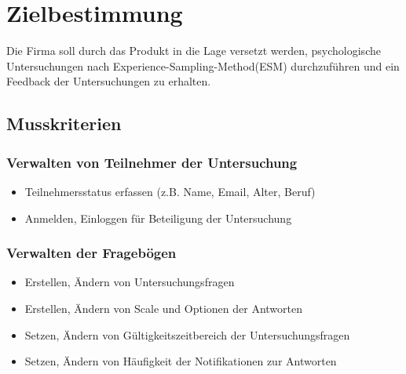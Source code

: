 \documentclass[a4paper]{scrreprt}
\begin{document}
 
 
    \tableofcontents
 
    \chapter{Zielbestimmung}
        Die Firma soll durch das Produkt in die Lage versetzt werden, psychologische Untersuchungen nach Experience-Sampling-Method(ESM) durchzuf\"uhren und ein Feedback der Untersuchungen zu erhalten.
 
 
        \section{Musskriterien}

            \subsection{Verwalten von Teilnehmer der Untersuchung}
                \begin{itemize}
                    \item Teilnehmersstatus erfassen (z.B. Name, Email, Alter, Beruf)
                    \item Anmelden, Einloggen f\"ur Beteiligung der Untersuchung
                \end{itemize}
            
            \subsection{Verwalten der Frageb\"ogen}
                \begin{itemize}
                    \item Erstellen, \"Andern von Untersuchungsfragen
                    \item Erstellen, \"Andern von Scale und Optionen der Antworten
                    \item Setzen, \"Andern von G\"ultigkeitszeitbereich der Untersuchungsfragen
                    \item Setzen, \"Andern von H\"aufigkeit der Notifikationen zur Antworten
                \end{itemize}
            
\end{document}
